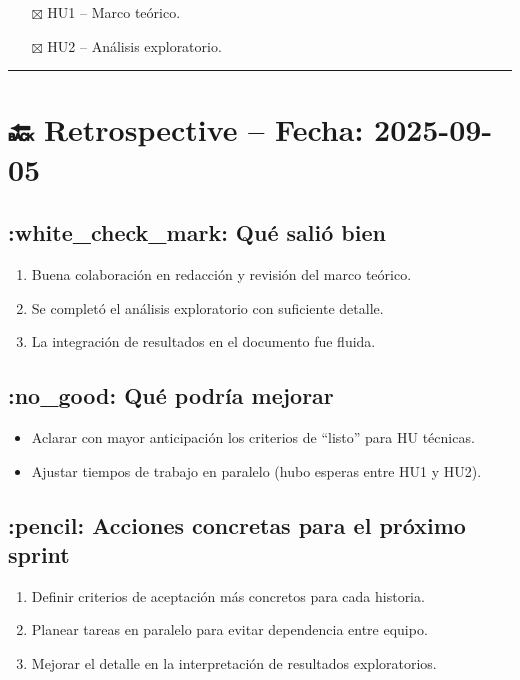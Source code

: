 \documentclass[
  11pt,
]{article}
\providecommand{\tightlist}{%
  \setlength{\itemsep}{0pt}\setlength{\parskip}{0pt}}
\begin{document}
\begin{itemize}
\tightlist
\item[$\boxtimes$]
  HU1 -- Marco teórico.
\item[$\boxtimes$]
  HU2 -- Análisis exploratorio.
\end{itemize}

\begin{center}\rule{0.5\linewidth}{0.5pt}\end{center}

\section{🔙 Retrospective -- Fecha:
2025-09-05}\label{retrospective-fecha-2025-09-05}

\subsection{:white\_check\_mark: Qué salió
bien}\label{white_check_mark-quuxe9-saliuxf3-bien}

\begin{enumerate}
\def\labelenumi{\arabic{enumi}.}
\tightlist
\item
  Buena colaboración en redacción y revisión del marco teórico.
\item
  Se completó el análisis exploratorio con suficiente detalle.
\item
  La integración de resultados en el documento fue fluida.
\end{enumerate}

\subsection{:no\_good: Qué podría
mejorar}\label{no_good-quuxe9-podruxeda-mejorar}

\begin{itemize}
\tightlist
\item
  Aclarar con mayor anticipación los criterios de ``listo'' para HU
  técnicas.
\item
  Ajustar tiempos de trabajo en paralelo (hubo esperas entre HU1 y HU2).
\end{itemize}

\subsection{:pencil: Acciones concretas para el próximo
sprint}\label{pencil-acciones-concretas-para-el-pruxf3ximo-sprint}

\begin{enumerate}
\def\labelenumi{\arabic{enumi}.}
\tightlist
\item
  Definir criterios de aceptación más concretos para cada historia.
\item
  Planear tareas en paralelo para evitar dependencia entre equipo.
\item
  Mejorar el detalle en la interpretación de resultados exploratorios.
\end{enumerate}
\end{document}
